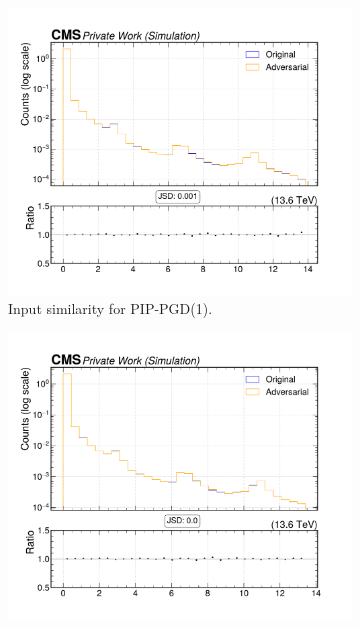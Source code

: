 \begin{figure}[htbp]
  \centering
  \begin{subfigure}[t]{0.32\textwidth}
    \includegraphics[width=\linewidth]{media/output/features/compare/combined_it_1/cmp_vtx_arr_sv_dxy.pdf}
    \caption*{Input similarity for PIP-PGD(1).}
  \end{subfigure}\hfill
  \begin{subfigure}[t]{0.32\textwidth}
    \includegraphics[width=\linewidth]{media/output/features/compare/combined_it_2/cmp_vtx_arr_sv_dxy.pdf}

\end{subfigure}
\end{figure}
